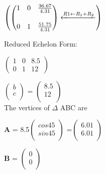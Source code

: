 \documentclass{article}
\newcommand{\myvec}[1]{\ensuremath{\begin{pmatrix}#1\end{pmatrix}}}
\begin{document}
  \vspace{5mm}
  \begin{center}
  $\begin{pmatrix}
	  \myvec{1 & 0 & \frac{36.67}{4.31} \vspace{5mm}\\ 0 & 1 & \frac{51.75}{4.31}}
    \xleftarrow{R1 \leftarrow R_1+R_2}
    \end{pmatrix}$
  \\
	  \end{center}
  \vspace{5mm}
  Reduced Echelon Form: 
  \begin{center}
  $\begin{pmatrix}
	  1 & 0 & 8.5 \\ 0 & 1 & 12
    \end{pmatrix}$
    \\
	  \end{center}
    \vspace{5mm}
      $\begin{pmatrix}
            b\\
            c\\
        \end{pmatrix}$
            =
            $\begin{pmatrix}
            8.5\\
            12\\
        \end{pmatrix}$
        \vspace{3mm}
	\pagebreak
   \\  The vertices of $\Delta$ ABC are \\ \vspace{3mm}
     \raggedright \textbf{A} = 8.5$\begin{pmatrix}
                 cos 45 \\ 
                 sin 45 \\
              \end{pmatrix}$
              =$\begin{pmatrix}
                 6.01 \\
                 6.01 \\
                 \end{pmatrix}$
                 \vspace{5mm}
              \\ \raggedright  \textbf{B} = $\begin{pmatrix}
                 0\\
                 0\\
              \end{pmatrix}$
\end{document}
